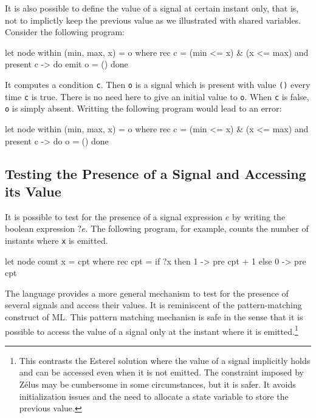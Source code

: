 \documentclass[11pt,titlepage,twoside]{report}
\newcommand{\zelus}{{\sf Z\'elus}}
\newcommand{\esterel}{{\sf Esterel}}
\begin{document}
It is also possible to define the value of a signal at certain instant only,
that is, not to implictly keep the previous value as we illustrated with
shared variables. %
Consider the following program:
\begin{runverbatim}[withresult]
let node within (min, max, x) = o where
  rec c = (min <= x) & (x <= max)
  and present c -> do emit o = () done
\end{runverbatim}
It computes a condition \verb-c-. Then \verb-o- is a signal
which is present with value \verb-()- every time \verb-c- is
true. There is no need here to give an initial value to \verb-o-. When \verb-c- is
false, \verb-o- is simply absent. Writting the following program would lead to
an error:

\begin{runverbatim}
let node within (min, max, x) = o where
  rec c = (min <= x) & (x <= max)
  and present c -> do o = () done
\end{runverbatim}

\subsection{Testing the Presence of a Signal and Accessing its Value} %
It is possible to test for the presence of a signal expression $e$ by
writing the boolean expression $? e$. The following program, for
example, counts the number of instants where \verb-x- is emitted.
\begin{runverbatim}[withresult]
let node count x = cpt where
  rec cpt = if ?x then 1 -> pre cpt + 1 else 0 -> pre cpt
\end{runverbatim}

The language provides a more general mechanism to test for the
presence of several signals and access their values. It is reminiscent
of the pattern-matching construct of ML.  This pattern matching
mechanisn is safe in the sense that it is possible to access the value
of a signal only at the instant where it is emitted.\footnote{This
  contrasts the \esterel{} solution where the value of a signal
  implicitly holds and can be accessed even when it is not
  emitted. The constraint imposed by \zelus{} may be cumbersome in some circumstances,
  but it is safer. It avoids initialization issues and
  the need to allocate a state variable to store the previous
  value.}
\end{document}
